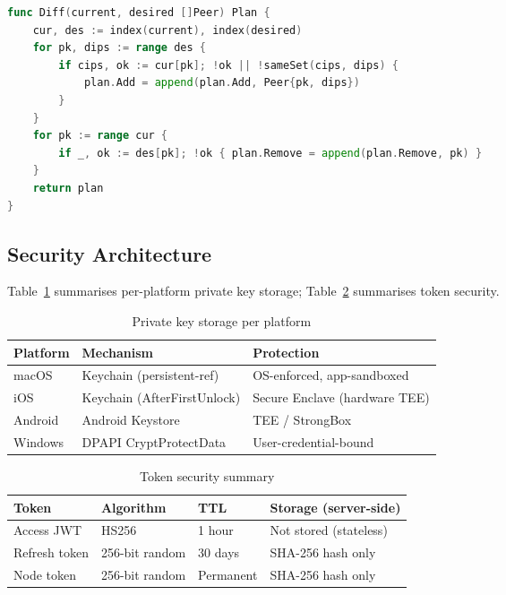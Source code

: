 \documentclass[12pt,a4paper]{report}
\begin{document}
\begin{lstlisting}[language=Go, caption=Peer reconciliation diff (agent/internal/reconcile/reconcile.go)]
func Diff(current, desired []Peer) Plan {
    cur, des := index(current), index(desired)
    for pk, dips := range des {
        if cips, ok := cur[pk]; !ok || !sameSet(cips, dips) {
            plan.Add = append(plan.Add, Peer{pk, dips})
        }
    }
    for pk := range cur {
        if _, ok := des[pk]; !ok { plan.Remove = append(plan.Remove, pk) }
    }
    return plan
}
\end{lstlisting}

\subsection{Security Architecture}

Table~\ref{tab:keysec} summarises per-platform private key storage; Table~\ref{tab:tokensec} summarises token security.

\begin{table}[H]
\centering\small
\caption{Private key storage per platform}
\label{tab:keysec}
\begin{tabular}{lll}
\toprule
\textbf{Platform} & \textbf{Mechanism} & \textbf{Protection}\\
\midrule
macOS  & Keychain (persistent-ref)            & OS-enforced, app-sandboxed\\
iOS    & Keychain (AfterFirstUnlock)           & Secure Enclave (hardware TEE)\\
Android & Android Keystore                    & TEE / StrongBox\\
Windows & DPAPI CryptProtectData              & User-credential-bound\\
\bottomrule
\end{tabular}
\end{table}

\begin{table}[H]
\centering\small
\caption{Token security summary}
\label{tab:tokensec}
\begin{tabular}{llll}
\toprule
\textbf{Token} & \textbf{Algorithm} & \textbf{TTL} & \textbf{Storage (server-side)}\\
\midrule
Access JWT       & HS256              & 1 hour    & Not stored (stateless)\\
Refresh token    & 256-bit random     & 30 days   & SHA-256 hash only\\
Node token       & 256-bit random     & Permanent & SHA-256 hash only\\
\bottomrule
\end{tabular}
\end{table}
\end{document}
